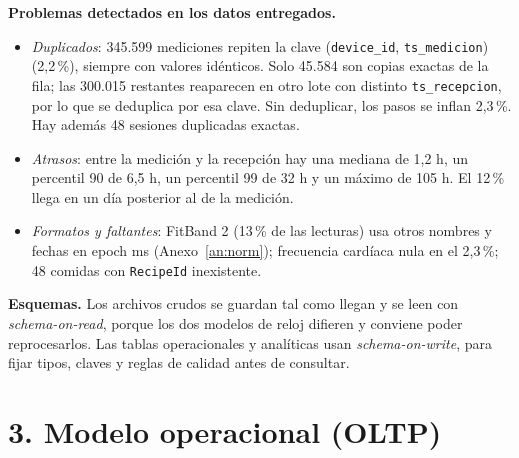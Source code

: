 \documentclass[11pt]{article}
\newcommand{\seccion}[1]{\vspace{-1.2ex}\section*{#1}\vspace{-0.6ex}}
\newcommand{\codigo}[1]{\texttt{\small #1}}
\begin{document}
\textbf{Problemas detectados en los datos entregados.}
\begin{itemize}
    \item \emph{Duplicados}: 345.599 mediciones repiten la clave
    (\codigo{device\_id}, \codigo{ts\_medicion}) (2,2\,\%), siempre con
    valores idénticos. Solo 45.584 son copias exactas de la fila; las
    300.015 restantes reaparecen en otro lote con distinto
    \codigo{ts\_recepcion}, por lo que se deduplica por esa clave. Sin deduplicar, los pasos
    se inflan 2,3\,\%. Hay además 48 sesiones duplicadas exactas.
    \item \emph{Atrasos}: entre la medición y la recepción hay una mediana
    de 1,2 h, un percentil 90 de 6,5 h, un percentil 99 de 32 h y un máximo
    de 105 h. El 12\,\% llega en un día posterior al de la medición.
    \item \emph{Formatos y faltantes}: FitBand 2 (13\,\% de las lecturas)
    usa otros nombres y fechas en epoch ms (Anexo~\ref{an:norm});
    frecuencia cardíaca nula en el 2,3\,\%; 48 comidas con
    \codigo{RecipeId} inexistente.
\end{itemize}

\textbf{Esquemas.} Los archivos crudos se guardan tal como llegan y
se leen con \emph{schema-on-read}, porque los dos modelos de reloj
difieren y conviene poder reprocesarlos. Las tablas operacionales y
analíticas usan \emph{schema-on-write}, para fijar tipos, claves y
reglas de calidad antes de consultar.



\seccion{3. Modelo operacional (OLTP)}
\end{document}
